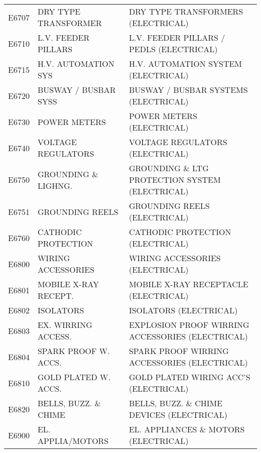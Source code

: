 \begin{longtable}[l]{l%
                  l|%
                  l|}
\rowcolor{thetableheadbgcolor!0.25!white} E6707       & DRY TYPE TRANSFORMER   & DRY TYPE TRANSFORMERS (ELECTRICAL)   \\
\rowcolor{thetableheadbgcolor!0.25!white} E6710       & L.V. FEEDER PILLARS   & L.V. FEEDER PILLARS / PEDLS (ELECTRICAL)   \\
\rowcolor{thetableheadbgcolor!0.25!white} E6715       & H.V. AUTOMATION SYS   & H.V. AUTOMATION SYSTEM (ELECTRICAL)   \\
\rowcolor{thetableheadbgcolor!0.25!white} E6720       & BUSWAY / BUSBAR SYSS   & BUSWAY / BUSBAR SYSTEMS (ELECTRICAL)   \\
\rowcolor{thetableheadbgcolor!0.25!white} E6730       & POWER METERS   & POWER METERS (ELECTRICAL)   \\
\rowcolor{thetableheadbgcolor!0.25!white} E6740       & VOLTAGE REGULATORS   & VOLTAGE REGULATORS (ELECTRICAL)   \\
\rowcolor{thetableheadbgcolor!0.25!white} E6750       & GROUNDING \& LIGHNG.   & GROUNDING \& LTG PROTECTION SYSTEM (ELECTRICAL)   \\
\rowcolor{thetableheadbgcolor!0.25!white} E6751       & GROUNDING REELS   & GROUNDING REELS (ELECTRICAL)   \\
\rowcolor{thetableheadbgcolor!0.25!white} E6760       & CATHODIC PROTECTION   & CATHODIC PROTECTION (ELECTRICAL)   \\
\rowcolor{thetableheadbgcolor!0.25!white} E6800       & WIRING ACCESSORIES   & WIRING ACCESSORIES (ELECTRICAL)   \\
\rowcolor{thetableheadbgcolor!0.25!white} E6801       & MOBILE X-RAY RECEPT.   & MOBILE X-RAY RECEPTACLE (ELECTRICAL)   \\
\rowcolor{thetableheadbgcolor!0.25!white} E6802       & ISOLATORS   & ISOLATORS (ELECTRICAL)   \\
\rowcolor{thetableheadbgcolor!0.25!white} E6803       & EX. WIRRING ACCESS.   & EXPLOSION PROOF WIRRING ACCESSORIES (ELECTRICAL)   \\
\rowcolor{thetableheadbgcolor!0.25!white} E6804       & SPARK PROOF W. ACCS.   & SPARK PROOF WIRRING ACCESSORIES (ELECTRICAL)   \\
\rowcolor{thetableheadbgcolor!0.25!white} E6810       & GOLD PLATED W. ACCS.   & GOLD PLATED WIRING ACC'S (ELECTRICAL)   \\
\rowcolor{thetableheadbgcolor!0.25!white} E6820       & BELLS, BUZZ. \& CHIME   & BELLS, BUZZ. \& CHIME DEVICES (ELECTRICAL)   \\
\rowcolor{thetableheadbgcolor!0.25!white} E6900       & EL. APPLIA/MOTORS   & EL. APPLIANCES \& MOTORS (ELECTRICAL)   \\

\end{longtable}
